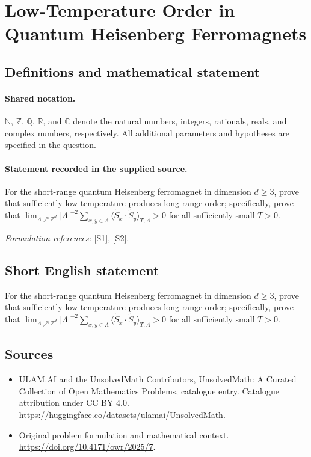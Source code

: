 \documentclass[11pt]{article}
\newcommand{\sref}[2]{\hyperlink{source:#1:#2}{[S#2]}}
\begin{document}
\section{Low-Temperature Order in Quantum Heisenberg Ferromagnets}\label{statement}

\subsection{Definitions and mathematical statement}

\paragraph{Shared notation.}$\mathbb N$, $\mathbb Z$, $\mathbb Q$, $\mathbb R$, and $\mathbb C$ denote the natural numbers, integers, rationals, reals, and complex numbers, respectively. All additional parameters and hypotheses are specified in the question.


\paragraph{Statement recorded in the supplied source.}
For the short-range quantum Heisenberg ferromagnet in dimension $d\geq 3$, prove that sufficiently low temperature produces long-range order; specifically, prove that $\lim_{\Lambda\nearrow\mathbb{Z}^d}|\Lambda|^{-2}\sum_{x,y\in\Lambda}\langle\widetilde S_x\cdot\widetilde S_y\rangle_{T,\Lambda}>0$ for all sufficiently small $T>0$.
\par\smallskip\textit{Formulation references:} \sref{statement}{1}, \sref{statement}{2}.
\subsection{Short English statement}
For the short-range quantum Heisenberg ferromagnet in dimension $d\geq 3$, prove that sufficiently low temperature produces long-range order; specifically, prove that $\lim_{\Lambda\nearrow\mathbb{Z}^d}|\Lambda|^{-2}\sum_{x,y\in\Lambda}\langle\widetilde S_x\cdot\widetilde S_y\rangle_{T,\Lambda}>0$ for all sufficiently small $T>0$.
\subsection{Sources}
\begin{itemize}
\item[\hypertarget{source:statement:1}{S1}] ULAM.AI and the UnsolvedMath Contributors, UnsolvedMath: A Curated Collection of Open Mathematics Problems, catalogue entry. Catalogue attribution under CC BY 4.0.
\url{https://huggingface.co/datasets/ulamai/UnsolvedMath}.
\item[\hypertarget{source:statement:2}{S2}] Original problem formulation and mathematical context.
\url{https://doi.org/10.4171/owr/2025/7}.
\end{itemize}
\label{end:statement}
\end{document}
